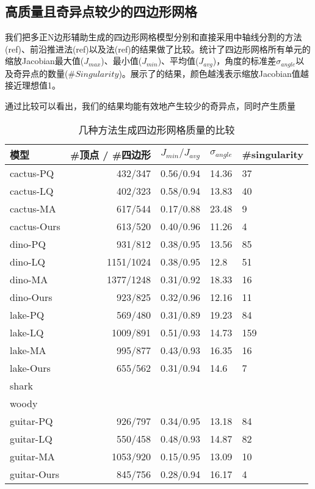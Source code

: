 \subsection{高质量且奇异点较少的四边形网格}\label{sec:comparison}
我们把多正N边形辅助生成的四边形网格模型分别和直接采用中轴线分割的方法(ref)、前沿推进法(ref)以及法(ref)的结果做了比较。统计了四边形网格所有单元的缩放Jacobian最大值($J_{max}$)、最小值($J_{min}$)、平均值($J_{avg}$)，角度的标准差$\sigma_{angle}$以及奇异点的数量($\#Singularity$)。展示了的结果，颜色越浅表示缩放Jacobian值越接近理想值1。

通过比较可以看出，我们的结果均能有效地产生较少的奇异点，同时产生质量
\begin{table}[t]
	\caption{几种方法生成四边形网格质量的比较}
		\centering \scalebox{0.8}
		{
			\begin{tabular}{lrrll}
				\toprule
				模型  & \#顶点 / \#四边形 & $J_{min}/J_{avg}$ & $\sigma_{angle}$ & \#singularity \\
				\midrule
				cactus-PQ & 432/347 &	0.56/0.94 &	14.36 &	37\\
				cactus-LQ & 402/323 & 	0.58/0.94 &	13.83 & 40\\
				cactus-MA & 617/544	&   0.17/0.88 &	23.48&	9\\
				cactus-Ours& 613/520&	0.40/0.96 &	11.26&	4\\
				\midrule
				dino-PQ &931/812&	0.38/0.95&	 13.56&	85\\
				dino-LQ &1151/1024	&0.38/0.95	&12.8&	51\\
				dino-MA&1377/1248&	0.31/0.92&	18.33	&16\\
				dino-Ours&923/825&	0.32/0.96&	12.16&	11 \\
				\midrule
				lake-PQ&569/480&	0.31/0.89&	19.23&	84\\
				lake-LQ& 1009/891	& 0.51/0.93& 14.73&159\\
				lake-MA&995/877	&0.43/0.93&	16.35&	16\\
				lake-Ours&655/562&	0.31/0.94&	14.6&	7\\
				
				\midrule
				shark&&&&\\
				\midrule
				woody&&&&\\
				\midrule
				guitar-PQ&926/797&	0.34/0.95&	13.18&	84\\
				
				guitar-LQ&550/458&	0.48/0.93&14.87	&82\\
				
				guitar-MA&1053/920&	0.15/0.95&	13.09&	10\\
				
				guitar-Ours&845/756&	0.28/0.94&	16.17&	4\\
				
				
				\bottomrule
			\end{tabular} 
		}
		\label{table:comparedata}
		\vspace{-1mm}
		
\end{table}	
